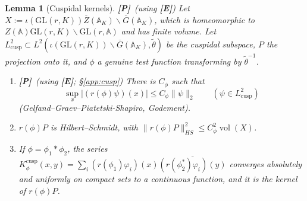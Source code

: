 \documentclass[12pt]{article}
\newcommand{\ov}[1]{\overline{#1}}
\newcommand{\A}{\mathbb{A}}
\newcommand{\vol}{\operatorname{vol}}
\newcommand{\GL}{\mathrm{GL}}
\newcommand{\Gb}{\ov{G}}
\newcommand{\Zb}{\ov{Z}}
\newcommand{\Pv}{\textbf{[P]}}
\newcommand{\Ev}{\textbf{[E]}}
\theoremstyle{plain}
\newtheorem{lemma}[theorem]{Lemma}
\theoremstyle{definition}
\begin{document}
\begin{lemma}[Cuspidal kernels]\label{lem:A1}\Pv\ (using \Ev)
Let $X:=\iota(\GL(r,K))\Zb(\A_K)\backslash\Gb(\A_K)$, which is homeomorphic to $Z(\A)\GL(r,K)\backslash\GL(r,\A)$ and has finite volume. Let $L^2_{\mathrm{cusp}}\subset L^2(\iota(\GL(r,K))\backslash\Gb(\A_K),\tilde\theta)$ be the cuspidal subspace, $P$ the projection onto it, and $\phi$ a genuine test function transforming by $\tilde\theta^{-1}$.
\begin{enumerate}[label=(\alph*)]
\item \Pv\ (using \Ev; \S\ref{app:cusp}) There is $C_\phi$ such that
\[ \sup_{x}|(r(\phi)\psi)(x)|\le C_\phi\|\psi\|_2\qquad(\psi\in L^2_{\mathrm{cusp}}) \]
(Gelfand--Graev--Piatetski-Shapiro, Godement).
\item $r(\phi)P$ is Hilbert--Schmidt, with $\|r(\phi)P\|_{HS}^2\le C_\phi^2\vol(X)$.
\item If $\phi=\phi_1*\phi_2$, the series $K^{\mathrm{cusp}}_\phi(x,y)=\sum_i(r(\phi_1)\varphi_i)(x)\ov{(r(\phi_2^*)\varphi_i)(y)}$ converges absolutely and uniformly on compact sets to a continuous function, and it is the kernel of $r(\phi)P$.
\end{enumerate}
\end{lemma}
\end{document}
